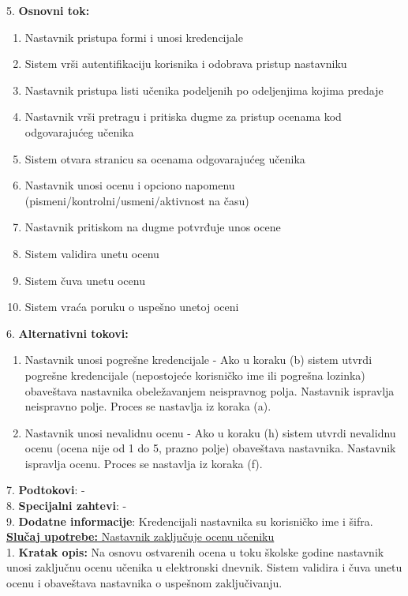 \documentclass{article}
\begin{document}
5. \textbf{Osnovni tok:} 
\begin{enumerate} [label=(\alph*)]
\item Nastavnik pristupa formi i unosi kredencijale 
\item Sistem vrši autentifikaciju korisnika i odobrava pristup nastavniku
\item Nastavnik pristupa listi učenika podeljenih po odeljenjima kojima predaje
\item Nastavnik vrši pretragu i pritiska dugme za pristup ocenama kod odgovarajućeg učenika
\item Sistem otvara stranicu sa ocenama odgovarajućeg učenika
\item Nastavnik unosi ocenu i opciono napomenu (pismeni/kontrolni/usmeni/aktivnost na času)
\item Nastavnik pritiskom na dugme potvrđuje unos ocene
\item Sistem validira unetu ocenu
\item Sistem čuva unetu ocenu
\item Sistem vraća poruku o uspešno unetoj oceni
\end{enumerate}

6. \textbf{Alternativni tokovi:}
\begin{enumerate} [label=(\roman*)]
\item Nastavnik unosi pogrešne kredencijale - Ako u koraku (b) sistem utvrdi pogrešne kredencijale (nepostojeće korisničko ime ili pogrešna lozinka) obaveštava nastavnika obeležavanjem neispravnog polja. Nastavnik ispravlja neispravno polje. Proces se nastavlja iz koraka (a).
\item Nastavnik unosi nevalidnu ocenu - Ako u koraku (h) sistem utvrdi nevalidnu ocenu (ocena nije od 1 do 5, prazno polje) obaveštava nastavnika. Nastavnik ispravlja ocenu. Proces se nastavlja iz koraka (f).
\end{enumerate}

7. \textbf{Podtokovi}: - \\

8. \textbf{Specijalni zahtevi}: - \\

9. \textbf{Dodatne informacije}: Kredencijali nastavnika su korisničko ime i šifra. \\


\underline{\textbf{Slučaj upotrebe:} Nastavnik zaključuje ocenu učeniku} \\

1. \textbf{Kratak opis:} Na osnovu ostvarenih ocena u toku školske godine nastavnik unosi zaključnu ocenu učenika u elektronski dnevnik. Sistem validira i čuva unetu ocenu i obaveštava nastavnika o uspešnom zaključivanju. \\
\end{document}
